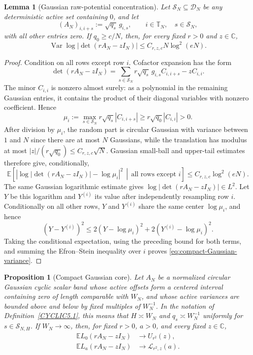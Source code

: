 \documentclass[11pt,reqno]{amsart}
\numberwithin{equation}{section}
\newtheorem{proposition}[theorem]{Proposition}
\newtheorem{lemma}[theorem]{Lemma}
\theoremstyle{definition}
\theoremstyle{remark}
\newcommand{\C}{\mathbb C}
\newcommand{\E}{\mathbb E}
\newcommand{\1}{\mathbf 1}
\begin{document}
\begin{lemma}[Gaussian raw-potential concentration]
\label{lem:compact-Gaussian-concentration}
Let \(\mathcal S_N\subseteq\mathcal D_N\) be any deterministic active
set containing \(0\), and let
\[
 (A_N)_{i,i+s}:=\sqrt{q_s}\,g_{i,s},
 \qquad i\in\mathbb T_N,\quad s\in\mathcal S_N,
\]
with all other entries zero.  If \(q_0\geq c/N\), then, for every fixed
\(r>0\) and \(z\in\C\),
\begin{equation}\label{eq:compact-Gaussian-variance}
\operatorname{Var}\log|\det(rA_N-zI_N)|
 \le C_{r,z,c}N\log^2(eN).
\end{equation}
\end{lemma}

\begin{proof}
Condition on all rows except row $i$.  Cofactor expansion has the form
\[
 \det(rA_N-zI_N)
 =\sum_{s\in\mathcal S_N}
   r\sqrt{q_s}\,g_{i,s}C_{i,i+s}-zC_{i,i}.
\]
The minor $C_{i,i}$ is nonzero almost surely: as a polynomial in the
remaining Gaussian entries, it contains the product of their diagonal
variables with nonzero coefficient.  Hence
\[
 \mu_i:=\max_{s\in\mathcal S_N} r\sqrt{q_s}|C_{i,i+s}|
 \ge r\sqrt{q_0}|C_{i,i}|>0.
\]
After division by $\mu_i$, the random part is circular Gaussian with
variance between $1$ and $N$ since there are at most $N$ Gaussians, while the translation has modulus at most
$|z|/(r\sqrt{q_0})\le C_{r,z,c}\sqrt N$.  Gaussian small-ball and upper-tail
estimates therefore give, conditionally,
\[
 \E\left[
 \left|\log|\det(rA_N-zI_N)|-\log\mu_i\right|^2
 \,\middle|\,\text{all rows except }i\right]
 \le C_{r,z,c}\log^2(eN).
\]
The same Gaussian logarithmic estimate gives
\(\log|\det(rA_N-zI_N)|\in L^2\).  Let \(Y\) be this logarithm and
\(Y^{(i)}\) its value after independently resampling row \(i\).
Conditionally on all other rows, \(Y\) and \(Y^{(i)}\) share the same
center \(\log\mu_i\), and hence
\[
 (Y-Y^{(i)})^2
 \leq
 2(Y-\log\mu_i)^2+2(Y^{(i)}-\log\mu_i)^2.
\]
Taking the conditional expectation, using the preceding bound for both
terms, and summing the Efron--Stein inequality over \(i\) proves
\eqref{eq:compact-Gaussian-variance}.
\end{proof}

\begin{proposition}[Compact Gaussian core]\label{prop:compact-gaussian-core}
Let $A_N$ be a normalized circular Gaussian cyclic scalar band whose active
offsets form a centered interval containing zero of length comparable with
$W_N$, and whose active variances are bounded above and below by fixed multiples of
\(W_N^{-1}\).  In the notation of
Definition~\ref{CYCLIC5.1}, this means that \(H\asymp W_N\) and
\(q_s\asymp W_N^{-1}\) uniformly for \(s\in\mathcal S_{N,H}\).
If \(W_N\to\infty\), then, for fixed \(r>0\), \(a>0\), and every fixed
\(z\in\C\),
\begin{align}
\E L_0(rA_N-zI_N)&\longrightarrow U_{r^2}(z),                \label{eq:compact-core-raw}\\
 \E L_a(rA_N-zI_N)&\longrightarrow\mathcal L_{r^2,z}(a).      \label{eq:compact-core-cut}
\end{align}
\end{proposition}
\end{document}
